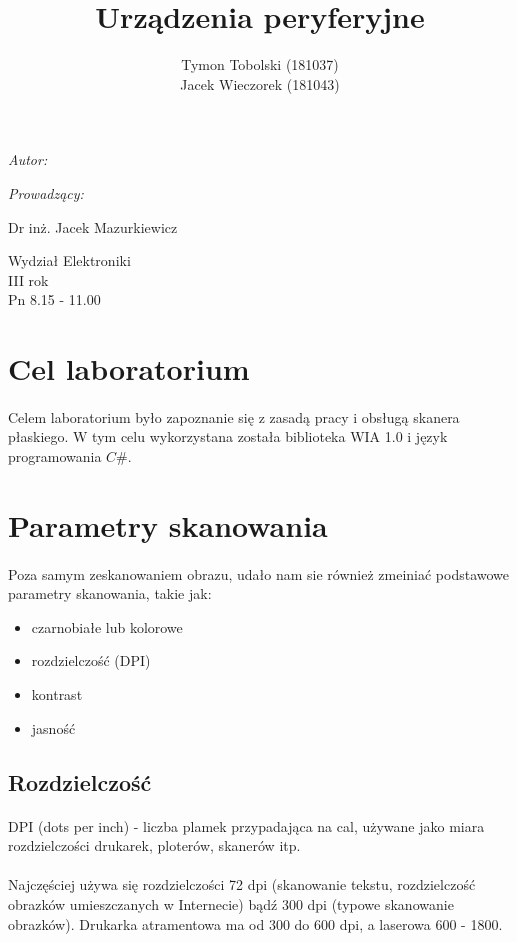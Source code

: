 \documentclass[wide,a4paper,titlepage,12pt] {article}
\title{Urządzenia peryferyjne}
\author{Tymon Tobolski (181037)\\ Jacek Wieczorek (181043)}
\makeatletter
\renewcommand{\maketitle}{
\begin{titlepage}
  \begin{center}
    \vspace*{3cm}
    \LARGE \@title \par
    \vspace{2cm}
    \textit{\small Autor:}\par
    \normalsize \@author\par \normalsize
    \vspace{3cm}
    \textit{\small Prowadzący:}\par
    Dr inż. Jacek Mazurkiewicz \par
    \vspace{2cm}
    Wydział Elektroniki\\ III rok\\ Pn 8.15 - 11.00\par
    \vspace{4cm}
    \small \@date
  \end{center}
\end{titlepage}
}
\makeatother
\begin{document}
\maketitle

\section{Cel laboratorium}
\paragraph{}
Celem laboratorium było zapoznanie się z zasadą pracy i obsługą skanera płaskiego. W tym celu wykorzystana została biblioteka WIA 1.0 i język programowania $C\#$.

\section{Parametry skanowania}
\paragraph{} %
Poza samym zeskanowaniem obrazu, udało nam sie również zmeiniać podstawowe parametry skanowania, takie jak:
\begin{itemize}
    \item czarnobiałe lub kolorowe
    \item rozdzielczość (DPI)
    \item kontrast
    \item jasność
\end{itemize}

\subsection{Rozdzielczość}
\paragraph{}
DPI (dots per inch) - liczba plamek przypadająca na cal, używane jako miara rozdzielczości drukarek, ploterów, skanerów itp. 
\paragraph{} %
\label{par:}
Najczęściej używa się rozdzielczości 72 dpi (skanowanie tekstu, rozdzielczość obrazków umieszczanych w Internecie) bądź 300 dpi (typowe skanowanie obrazków). Drukarka atramentowa ma od 300 do 600 dpi, a laserowa 600 - 1800. 
\end{document}
